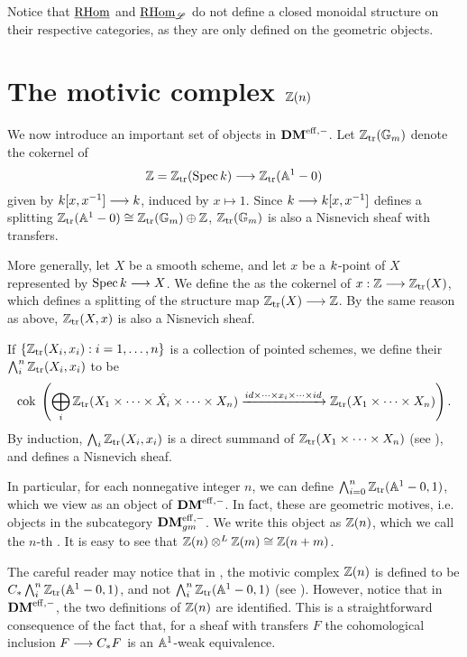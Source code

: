\begin{rmk}\label{rmk_partial_ihom}
Notice that $\underline{\mathrm{RHom}}$ and $\underline{\mathrm{RHom}}_{\mathscr{L}}$ do not define a closed
monoidal structure on their respective categories, as they are only
defined on the geometric objects.
\end{rmk}

\section{The motivic complex $\mathbb{Z}(n)$}
\label{sect_motivic_complex}

We now introduce an important set of objects in $\mathbf{DM}^{\mathrm{eff},-}$. Let 
$\mathbb{Z}_{\mathrm{tr}}(\mathbb{G}_m)$ denote the cokernel of
\[
   \mathbb{Z} = \mathbb{Z}_{\mathrm{tr}}(\mathrm{Spec}\, k) \longrightarrow \mathbb{Z}_{\mathrm{tr}}(\mathbb{A}^1 - 0)
\]
given by $k [x, x^{-1}] \longrightarrow k$, induced by
$x \mapsto 1$. Since $k \longrightarrow k[x, x^{-1}]$
defines a splitting $\mathbb{Z}_{\mathrm{tr}}(\mathbb{A}^1 - 0) \cong \mathbb{Z}_{\mathrm{tr}}(\mathbb{G}_m) \oplus \mathbb{Z}$,
$\mathbb{Z}_{\mathrm{tr}}(\mathbb{G}_m)$ is also a Nisnevich sheaf with transfers. 

More generally, let $X$ be a smooth scheme, and let $x$ be a 
$k$-point of $X$ represented by $\mathrm{Spec}\, k \longrightarrow X$. We 
define the  as the 
cokernel of $x: \mathbb{Z} \longrightarrow \mathbb{Z}_{\mathrm{tr}}(X)$, which defines a splitting of the 
structure map $\mathbb{Z}_{\mathrm{tr}}(X) \longrightarrow \mathbb{Z}$. By the same reason as above, 
$\mathbb{Z}_{\mathrm{tr}}(X, x)$ is also a Nisnevich sheaf.

If $\{\mathbb{Z}_{\mathrm{tr}}(X_i, x_i) : i = 1,\dots, n\}$ is a collection of 
pointed schemes, we define their  $\bigwedge_i^n
\mathbb{Z}_{\mathrm{tr}}(X_i, x_i)$ to be
\[
\mathrm{cok}\; \left( \bigoplus_i \mathbb{Z}_{\mathrm{tr}}(X_1 \times \cdots \times \hat{X_i} 
   \times \cdots \times X_n) \xrightarrow{id \times \cdots \times 
      x_i \times \cdots \times id} \mathbb{Z}_{\mathrm{tr}}(X_1 \times \cdots \times 
         X_n)\right).
\]
By induction, $\bigwedge_i \mathbb{Z}_{\mathrm{tr}}(X_i, x_i)$ is a direct summand of
$\mathbb{Z}_{\mathrm{tr}}(X_1 \times \cdots \times X_n)$ (see \cite[2.13]{MVW}),
and defines a Nisnevich sheaf.

In particular, for each nonnegative integer $n$, we can define 
$\bigwedge_{i = 0}^n \mathbb{Z}_{\mathrm{tr}}(\mathbb{A}^1 - 0, 1)$, which we view as an 
object of $\mathbf{DM}^{\mathrm{eff},-}$. In fact, these are geometric motives, i.e.
objects in the subcategory $\mathbf{DM}^{\mathrm{eff},-}_{gm}$. We write this object as
$\mathbb{Z}(n)$, which we call the $n$-th . It is 
easy to see that $\mathbb{Z}(n) \otimes^L \mathbb{Z}(m) \cong \mathbb{Z}(n + m)$. 

\begin{rmk}
  The careful reader may notice that in \cite{MVW}, the motivic
  complex $\mathbb{Z}(n)$ is defined to be $C_{*} \bigwedge_i^n \mathbb{Z}_{\mathrm{tr}}(\mathbb{A}^1 -
  0, 1)$, and not $\bigwedge_i^n \mathbb{Z}_{\mathrm{tr}}(\mathbb{A}^1 - 0, 1)$ (see
  \cite[3.1]{MVW}). However, notice that in $\mathbf{DM}^{\mathrm{eff},-}$, the two
  definitions of $\mathbb{Z}(n)$ are identified. This is a straightforward
  consequence of the fact that, for a sheaf with transfers $F$ the
  cohomological inclusion $F \longrightarrow C_{*} F$ is an $\mathbb{A}^1$-weak
  equivalence.
\end{rmk}


